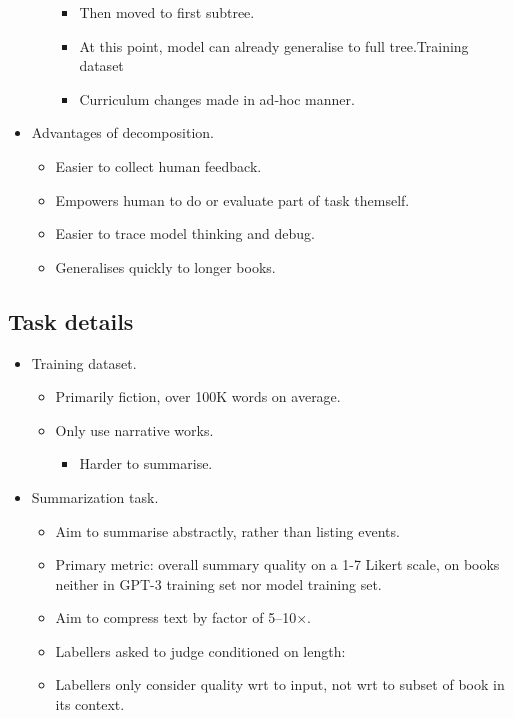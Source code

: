 \begin{itemize}
\begin{itemize}
\begin{itemize}
            \item Then moved to first subtree.
            \item At this point, model can already generalise to full tree.Training dataset
            \item Curriculum changes made in ad-hoc manner.
        \end{itemize}
    \end{itemize}
    \item Advantages of decomposition.
    \begin{itemize}
        \item Easier to collect human feedback.
        \item Empowers human to do or evaluate part of task themself.
        \item Easier to trace model thinking and debug.
        \item Generalises quickly to longer books.
    \end{itemize}
\end{itemize}


\subsection{Task details}

\begin{itemize}
    \item Training dataset.
    \begin{itemize}
        \item Primarily fiction, over 100K words on average.
        \item Only use narrative works.
        \begin{itemize}
            \item Harder to summarise.
        \end{itemize}
    \end{itemize}
    \item Summarization task.
    \begin{itemize}
        \item Aim to summarise abstractly, rather than listing events.
        \item Primary metric: overall summary quality on a 1-7 Likert scale, on books neither in GPT-3 training set nor model training set.
        \item Aim to compress text by factor of 5--10$\times$.
        \item Labellers asked to judge conditioned on length: 
        \item Labellers only consider quality wrt to input, not wrt to subset of book in its context.
    \end{itemize}
\end{itemize}


